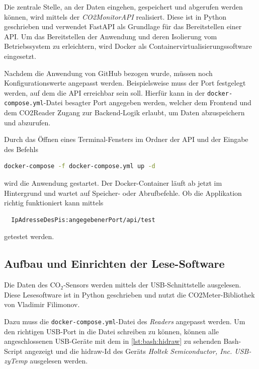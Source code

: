 \documentclass[a4paper,
    11pt,
    headings=small,
    ngerman,
    listof=totoc,
    numbers=noenddot]{scrreprt}[2021/11/13]
\begin{document}
Die zentrale Stelle, an der Daten eingehen, gespeichert und abgerufen werden können, wird mittels der \textit{CO2MonitorAPI} realisiert. Diese ist in Python geschrieben und verwendet FastAPI als Grundlage für das Bereitstellen einer API. Um das Bereitstellen der Anwendung und deren  Isolierung vom Betriebssystem zu erleichtern, wird Docker als Containervirtualisierungssoftware eingesetzt.

Nachdem die Anwendung von GitHub bezogen wurde, müssen noch Konfigurationswerte angepasst werden. Beispielsweise muss der Port festgelegt werden, auf dem die \ac{API} erreichbar sein soll. Hierfür kann in der \texttt{docker-compose.yml}-Datei besagter Port angegeben werden, welcher dem Frontend und dem CO2Reader Zugang zur Backend-Logik erlaubt, um Daten abzuspeichern und abzurufen.

Durch das Öffnen eines Terminal-Fensters im Ordner der \ac{API} und der Eingabe des Befehls

\begin{lstlisting}[language=Bash]
  docker-compose -f docker-compose.yml up -d
\end{lstlisting}

wird die Anwendung gestartet. Der Docker-Container läuft ab jetzt im Hintergrund und wartet auf Speicher- oder Abrufbefehle. Ob die Applikation richtig funktioniert kann mittels

\begin{lstlisting}
  IpAdresseDesPis:angegebenerPort/api/test
\end{lstlisting}

getestet werden.


\subsection{Aufbau und Einrichten der Lese-Software}

Die Daten des CO$_2$-Sensors werden mittels der USB-Schnittstelle ausgelesen. Diese Lesesoftware ist in Python geschrieben und nutzt die CO2Meter-Bibliothek von Vladimir Filimonov.
\autocite{github_co2meter}

Dazu muss die \texttt{docker-compose.yml}-Datei des \textit{Readers} angepasst werden. Um den richtigen USB-Port in die Datei schreiben zu können, können alle angeschlossenen USB-Geräte mit dem in \cref{lst:bash:hidraw} zu sehenden Bash-Script angezeigt und die \gls{hidraw}-Id des Geräts \textit{Holtek Semiconductor, Inc. USB-zyTemp} ausgelesen werden. \autocite{get_usb_hidraw}
\end{document}
